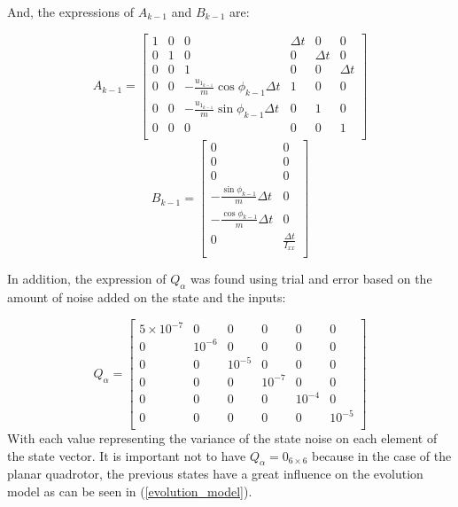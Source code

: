 \documentclass{thesisreport}
\begin{document}
And, the expressions of $A_{k-1}$ and $B_{k-1}$ are:

\begin{equation}
        A_{k-1} = \begin{bmatrix}
                1 & 0 & 0 & \Delta t  & 0 & 0 \\
                0 & 1 & 0 & 0  & \Delta t & 0 \\
                0 & 0 & 1 & 0 & 0 & \Delta t \\
                0 & 0 & -\frac{u_{1_{k-1}}}{m} \cos \phi_{k-1} \Delta t & 1 & 0 & 0 \\
                0 & 0 & -\frac{u_{1_{k-1}}}{m} \sin \phi_{k-1} \Delta t & 0 & 1 & 0 \\
                0 & 0 & 0 & 0 & 0 & 1 \\
            \end{bmatrix}
    \end{equation}
    \begin{equation}
        B_{k-1} = \begin{bmatrix}
            0 & 0 \\
            0 & 0 \\
            0 & 0 \\
            - \frac{\sin \phi_{k-1}}{m} \Delta t & 0 \\
            - \frac{\cos \phi_{k-1}}{m} \Delta t & 0 \\
            0 & \frac{\Delta t}{I_{xx}} \\
        \end{bmatrix}
    \end{equation}
    
In addition, the expression of $Q_{\alpha}$ was found using trial and error based on the amount of noise added on the state and the inputs:

\begin{equation}
        Q_{\alpha} = \begin{bmatrix}
                5 \times 10^{-7} & 0 & 0 & 0  & 0 & 0 \\
                0 & 10^{-6} & 0 & 0  & 0 & 0 \\
                0 & 0 & 10^{-5} & 0 & 0 & 0 \\
                0 & 0 & 0 & 10^{-7} & 0 & 0 \\
                0 & 0 & 0 & 0 & 10^{-4} & 0 \\
                0 & 0 & 0 & 0 & 0 & 10^{-5} \\
            \end{bmatrix}
\end{equation}
With each value representing the variance of the state noise on each element of the state vector. It is important not to have $Q_{\alpha}=0_{6 \times 6}$ because in the case of the planar quadrotor, the previous states have a great influence on the evolution model as can be seen in (\ref{evolution_model}).
\end{document}
